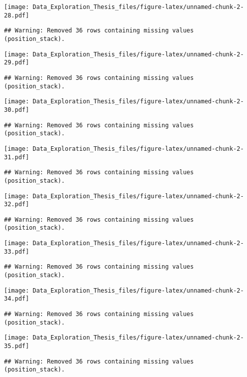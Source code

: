 \documentclass[]{article}
\begin{document}
\texttt{[image: Data\_Exploration\_Thesis\_files/figure-latex/unnamed-chunk-2-28.pdf]}

\begin{verbatim}
## Warning: Removed 36 rows containing missing values (position_stack).
\end{verbatim}

\texttt{[image: Data\_Exploration\_Thesis\_files/figure-latex/unnamed-chunk-2-29.pdf]}

\begin{verbatim}
## Warning: Removed 36 rows containing missing values (position_stack).
\end{verbatim}

\texttt{[image: Data\_Exploration\_Thesis\_files/figure-latex/unnamed-chunk-2-30.pdf]}

\begin{verbatim}
## Warning: Removed 36 rows containing missing values (position_stack).
\end{verbatim}

\texttt{[image: Data\_Exploration\_Thesis\_files/figure-latex/unnamed-chunk-2-31.pdf]}

\begin{verbatim}
## Warning: Removed 36 rows containing missing values (position_stack).
\end{verbatim}

\texttt{[image: Data\_Exploration\_Thesis\_files/figure-latex/unnamed-chunk-2-32.pdf]}

\begin{verbatim}
## Warning: Removed 36 rows containing missing values (position_stack).
\end{verbatim}

\texttt{[image: Data\_Exploration\_Thesis\_files/figure-latex/unnamed-chunk-2-33.pdf]}

\begin{verbatim}
## Warning: Removed 36 rows containing missing values (position_stack).
\end{verbatim}

\texttt{[image: Data\_Exploration\_Thesis\_files/figure-latex/unnamed-chunk-2-34.pdf]}

\begin{verbatim}
## Warning: Removed 36 rows containing missing values (position_stack).
\end{verbatim}

\texttt{[image: Data\_Exploration\_Thesis\_files/figure-latex/unnamed-chunk-2-35.pdf]}

\begin{verbatim}
## Warning: Removed 36 rows containing missing values (position_stack).
\end{verbatim}
\end{document}
